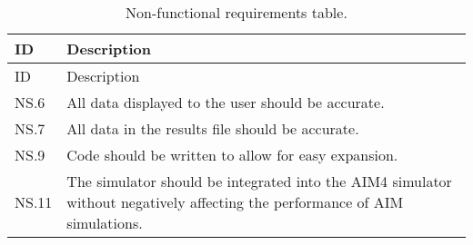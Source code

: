 \begin{longtable}{|p{0.1\linewidth}|p{0.9\linewidth}|}
\caption{Non-functional requirements table.}\label{tab:nonFunctionalRequirements}\\
\hline
ID & Description \\
\hline
\endfirsthead

\hline
ID & Description \\
\hline
\endhead

\hline
\endfoot

\hline
\endlastfoot

NS.6 & All data displayed to the user should be accurate. \\
\hline
NS.7 & All data in the results file should be accurate. \\
\hline
NS.9 & Code should be written to allow for easy expansion. \\
\hline
NS.11 & The simulator should be integrated into the AIM4 simulator without negatively affecting the performance of AIM simulations. \\
\end{longtable}